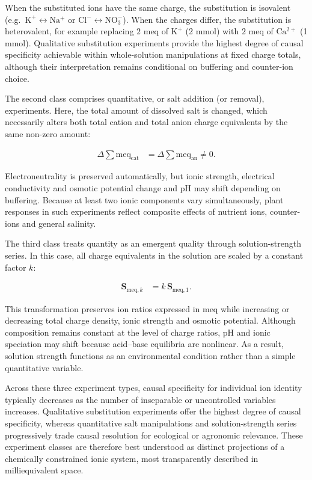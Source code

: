 \documentclass[
  letterpaper,
  DIV=11,
  numbers=noendperiod]{scrreprt}
\begin{document}
When the substituted ions have the same charge, the substitution is
isovalent (e.g.~\(\mathrm{K^+} \leftrightarrow \mathrm{Na^+}\) or
\(\mathrm{Cl^-} \leftrightarrow \mathrm{NO_3^-}\)). When the charges
differ, the substitution is heterovalent, for example replacing \(2\)
meq of \(\mathrm{K^+}\) (2 mmol) with \(2\) meq of \(\mathrm{Ca^{2+}}\)
(1 mmol). Qualitative substitution experiments provide the highest
degree of causal specificity achievable within whole-solution
manipulations at fixed charge totals, although their interpretation
remains conditional on buffering and counter-ion choice.

The second class comprises quantitative, or salt addition (or removal),
experiments. Here, the total amount of dissolved salt is changed, which
necessarily alters both total cation and total anion charge equivalents
by the same non-zero amount:

\begin{align*}
\Delta \sum \mathrm{meq}_{\text{cat}}
&= \Delta \sum \mathrm{meq}_{\text{an}}
\neq 0 .
\end{align*}

Electroneutrality is preserved automatically, but ionic strength,
electrical conductivity and osmotic potential change and pH may shift
depending on buffering. Because at least two ionic components vary
simultaneously, plant responses in such experiments reflect composite
effects of nutrient ions, counter-ions and general salinity.

The third class treats quantity as an emergent quality through
solution-strength series. In this case, all charge equivalents in the
solution are scaled by a constant factor \(k\):

\begin{align*}
\mathbf{S}_{\mathrm{meq},k}
&= k\, \mathbf{S}_{\mathrm{meq},1} .
\end{align*}

This transformation preserves ion ratios expressed in meq while
increasing or decreasing total charge density, ionic strength and
osmotic potential. Although composition remains constant at the level of
charge ratios, pH and ionic speciation may shift because acid--base
equilibria are nonlinear. As a result, solution strength functions as an
environmental condition rather than a simple quantitative variable.

Across these three experiment types, causal specificity for individual
ion identity typically decreases as the number of inseparable or
uncontrolled variables increases. Qualitative substitution experiments
offer the highest degree of causal specificity, whereas quantitative
salt manipulations and solution-strength series progressively trade
causal resolution for ecological or agronomic relevance. These
experiment classes are therefore best understood as distinct projections
of a chemically constrained ionic system, most transparently described
in milliequivalent space.
\end{document}
